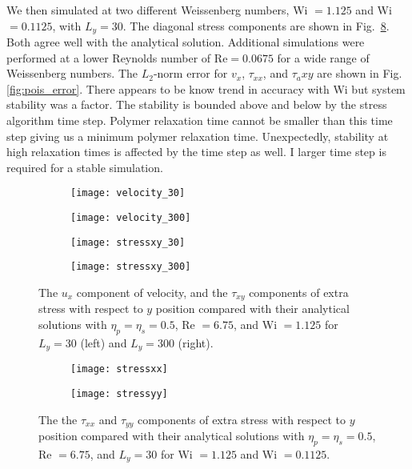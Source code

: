 We then simulated at two different Weissenberg numbers, Wi $=1.125$ and Wi $=0.1125$, with $L_y = 30$. The diagonal stress components are shown in Fig.~\ref{fig:diagonal_stress_poiseuille}. Both agree well with the analytical solution. Additional simulations were performed at a lower Reynolds number of $\mathrm{Re} = 0.0675$ for a wide range of Weissenberg numbers. The $L_2$-norm error for $v_x$, $\tau_{xx}$, and $\tau_a{xy}$ are shown in Fig. \ref{fig:pois_error}. There appears to be know trend in accuracy with Wi but system stability was a factor. The stability is bounded above and below by the stress algorithm time step. Polymer relaxation time cannot be smaller than this time step giving us a minimum polymer relaxation time. Unexpectedly, stability at high relaxation times is affected by the time step as well. I larger time step is required for a stable simulation.

\begin{figure}[htbp]
	\centering
\begin{subfigure}{0.5\linewidth}
	\texttt{[image: velocity\_30]}
	\label{fig:velocity_30}
\end{subfigure}\hfill
\begin{subfigure}{0.5\linewidth}
	\texttt{[image: velocity\_300]}
	\label{fig:velocity_300}
\end{subfigure}
\medskip

\begin{subfigure}{0.5\linewidth}
	\texttt{[image: stressxy\_30]}
	\label{fig:stressxy_30}
\end{subfigure}\hfill
\begin{subfigure}{0.5\linewidth}
	\texttt{[image: stressxy\_300]}
	\label{fig:stressxy_300}
\end{subfigure}
\caption{The $u_x$ component of velocity, and the $ \tau_{xy}$ components of extra stress with respect to $y$ position compared with their analytical solutions with $\eta_p = \eta_s = 0.5$, Re $= 6.75$, and Wi $= 1.125$ for $L_y = 30$ (left) and $L_y = 300$ (right).}
\label{fig:box_size_poiseuille}
\end{figure}

\begin{figure}
\begin{subfigure}{0.5\linewidth}
	\texttt{[image: stressxx]}
	\label{fig:stressxx}
\end{subfigure}\hfill
\begin{subfigure}{0.5\linewidth}
	\texttt{[image: stressyy]}
	\label{fig:stressyy}
\end{subfigure}
\caption{The the $ \tau_{xx}$ and $\tau_{yy}$ components of extra stress with respect to $y$ position compared with their analytical solutions with $\eta_p = \eta_s = 0.5$, Re $= 6.75$, and $L_y = 30$ for Wi $= 1.125$ and Wi $=0.1125$.}
\label{fig:diagonal_stress_poiseuille}
\end{figure}

